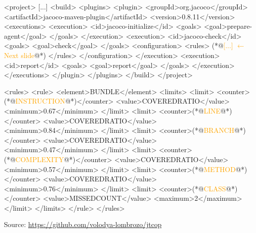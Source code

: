 \documentclass{article}
\begin{document}
\begin{multicols}{2}
{\tiny\begin{ffcode}
<project>
  [...]
  <build>
    <plugins>
      <plugin>
        <groupId>org.jacoco</groupId>
        <artifactId>jacoco-maven-plugin</artifactId>
        <version>0.8.11</version>
        <executions>
          <execution>
            <id>jacoco-initialize</id>
            <goals>
              <goal>prepare-agent</goal>
            </goals>
          </execution>
          <execution>
            <id>jacoco-check</id>
            <goals>
              <goal>check</goal>
            </goals>
            <configuration>
              <rules>
                (*@\textcolor{orange}{[...] \(\leftarrow\) Next slide}@*)
              </rules>
            </configuration>
          </execution>
          <execution>
            <id>report</id>
            <goals>
              <goal>report</goal>
            </goals>
          </execution>
        </executions>
      </plugin>
    </plugins>
  </build>
</project>
\end{ffcode}
}
\end{multicols}
\plush{}

\begin{multicols}{2}
{\tiny\begin{ffcode}
<rules>
  <rule>
    <element>BUNDLE</element>
    <limits>
      <limit>
        <counter>(*@\textcolor{orange}{INSTRUCTION}@*)</counter>
        <value>COVEREDRATIO</value>
        <minimum>0.67</minimum>
      </limit>
      <limit>
        <counter>(*@\textcolor{orange}{LINE}@*)</counter>
        <value>COVEREDRATIO</value>
        <minimum>0.84</minimum>
      </limit>
      <limit>
        <counter>(*@\textcolor{orange}{BRANCH}@*)</counter>
        <value>COVEREDRATIO</value>
        <minimum>0.47</minimum>
      </limit>
      <limit>
        <counter>(*@\textcolor{orange}{COMPLEXITY}@*)</counter>
        <value>COVEREDRATIO</value>
        <minimum>0.57</minimum>
      </limit>
      <limit>
        <counter>(*@\textcolor{orange}{METHOD}@*)</counter>
        <value>COVEREDRATIO</value>
        <minimum>0.76</minimum>
      </limit>
      <limit>
        <counter>(*@\textcolor{orange}{CLASS}@*)</counter>
        <value>MISSEDCOUNT</value>
        <maximum>2</maximum>
      </limit>
    </limits>
  </rule>
</rules>
\end{ffcode}
}
\end{multicols}
{\scriptsize Source: \url{https://github.com/volodya-lombrozo/jtcop}\par}
\plush{}
\end{document}
